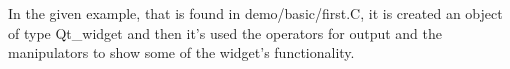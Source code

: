 In the given example, that is found in demo/basic/first.C, it is created an 
object of type Qt\_widget and then it's used the operators for output and the
manipulators to show some of the widget's functionality.








